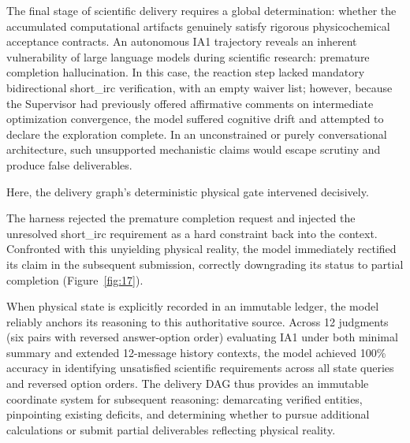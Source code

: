 The final stage of scientific delivery requires a global determination: whether the accumulated computational artifacts genuinely satisfy rigorous physicochemical acceptance contracts. An autonomous IA1 trajectory reveals an inherent vulnerability of large language models during scientific research: premature completion hallucination. In this case, the reaction step lacked mandatory bidirectional short\_irc verification, with an empty waiver list; however, because the Supervisor had previously offered affirmative comments on intermediate optimization convergence, the model suffered cognitive drift and attempted to declare the exploration complete. In an unconstrained or purely conversational architecture, such unsupported mechanistic claims would escape scrutiny and produce false deliverables.

Here, the delivery graph's deterministic physical gate intervened decisively. 


The harness rejected the premature completion request and injected the unresolved short\_irc requirement as a hard constraint back into the context. Confronted with this unyielding physical reality, the model immediately rectified its claim in the subsequent submission, correctly downgrading its status to partial completion (Figure~\ref{fig:17}).

When physical state is explicitly recorded in an immutable ledger, the model reliably anchors its reasoning to this authoritative source. Across 12 judgments (six pairs with reversed answer-option order) evaluating IA1 under both minimal summary and extended 12-message history contexts, the model achieved 100\% accuracy in identifying unsatisfied scientific requirements across all state queries and reversed option orders. The delivery DAG thus provides an immutable coordinate system for subsequent reasoning: demarcating verified entities, pinpointing existing deficits, and determining whether to pursue additional calculations or submit partial deliverables reflecting physical reality.


